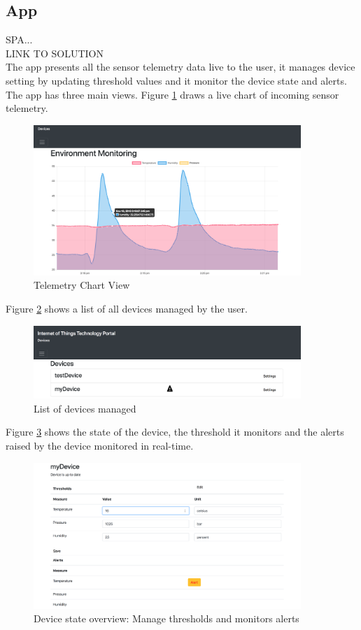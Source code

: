 \subsection{App}

SPA...\\ LINK TO SOLUTION \\
The app presents all the sensor telemetry data live to the user, it manages device setting by updating threshold values and it monitor the device state and alerts. The app has three main views.
Figure \ref{fig:chartview} draws a live chart of incoming sensor telemetry. 

\begin{figure}[H]
    \centering
    \includegraphics[width=0.9\textwidth]{figures/App/app_dashboard}
    \caption{Telemetry Chart View}
    \label{fig:chartview}
\end{figure}

Figure \ref{fig:devicelist} shows a list of all devices managed by the user. 

\begin{figure}[H]
    \centering
    \includegraphics[width=0.9\textwidth]{figures/App/app_device_list}
    \caption{List of devices managed}
    \label{fig:devicelist}
\end{figure}

Figure \ref{fig:deviceoverview} shows the state of the device, the threshold it monitors and the alerts raised by the device monitored in real-time.

\begin{figure}[H]
    \centering
    \includegraphics[width=0.9\textwidth]{figures/App/app_device_settings}
    \caption{Device state overview: Manage thresholds and monitors alerts}
    \label{fig:deviceoverview}
\end{figure}
